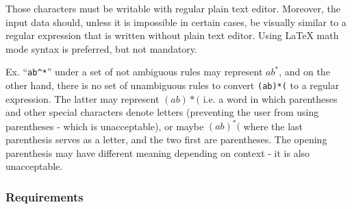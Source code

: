 \documentclass{article}
\begin{document}
Those characters must be writable with regular plain text editor. Moreover, the input data should,
unless it is impossible in certain cases, be visually similar to a regular expression that is
written without plain text editor. Using \LaTeX{} math mode syntax is preferred, but not
mandatory.

Ex. ``\verb|ab^*|'' under a set of not ambiguous rules may represent $ab^*$, and on the other hand,
there is no set of unambiguous rules to convert \verb|(ab)*(| to a regular expression. The latter
may represent $(ab)\ast($ i.e. a word in which parentheses and other special characters denote
letters (preventing the user from using parentheses - which is unacceptable), or maybe $(ab)^*($
where the last parenthesis serves as a letter, and the two first are parentheses. The opening
parenthesis may have different meaning depending on context - it is also unacceptable.

\subsubsection*{Requirements}
\end{document}
